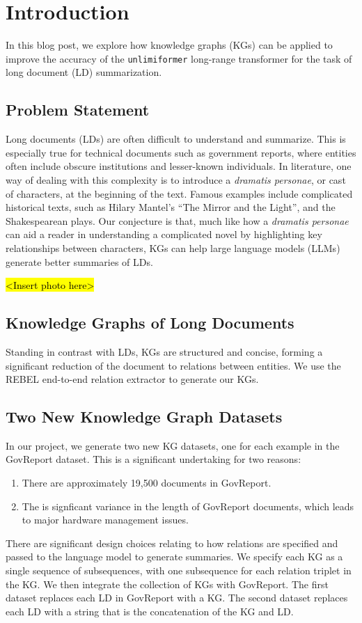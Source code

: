 \documentclass[12pt]{article}
\begin{document}
\section{Introduction}
In this blog post, we explore how knowledge graphs (KGs) can be applied to improve the accuracy of the \texttt{unlimiformer} long-range transformer for the task of long document (LD) summarization.


\subsection*{Problem Statement}
Long documents (LDs) are often difficult to understand and summarize. This is especially true for technical documents such as government reports, where entities often include obscure institutions and lesser-known individuals. In literature, one way of dealing with this complexity is to introduce a \emph{dramatis personae}, or cast of characters, at the beginning of the text. Famous examples include complicated historical texts, such as Hilary Mantel's  ``The Mirror and the Light'', and the Shakespearean plays. Our conjecture is that, much like how a \emph{dramatis personae} can aid a reader in understanding a complicated novel by highlighting key relationships between characters, KGs can help large language models (LLMs) generate better summaries of LDs.


\hl{<Insert photo here>}


\subsection*{Knowledge Graphs of Long Documents}
Standing in contrast with LDs, KGs are structured and concise, forming a significant reduction of the document to relations between entities. We use the REBEL end-to-end relation extractor to generate our KGs.


\subsection*{Two New Knowledge Graph Datasets}
In our project, we generate two new KG datasets, one for each example in the GovReport dataset. This is a significant undertaking for two reasons:
\begin{enumerate}
 \item There are approximately 19,500 documents in GovReport.
 \item The is signficant variance in the length of GovReport documents, which leads to major hardware management issues.
\end{enumerate}
There are significant design choices relating to how relations are specified and passed to the language model to generate summaries. We specify each KG as a single sequence of subsequences, with one subsequence for each relation triplet in the KG. We then integrate the collection of KGs with GovReport. The first dataset replaces each LD in GovReport with a KG. The second dataset replaces each LD with a string that is the concatenation of the KG and LD.
\end{document}
